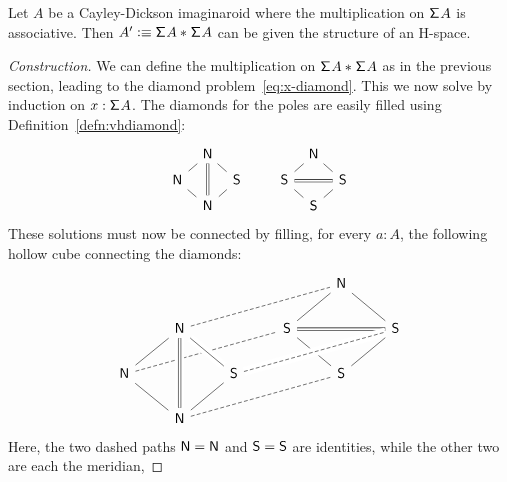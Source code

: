 \begin{defn}\label{def:imag-h-space}
Let $A$ be a Cayley-Dickson imaginaroid where the multiplication on
$\mathsf{\Sigma}^{} A$ is associative. Then $A' \vcentcolon\equiv {\mathsf{\Sigma}^{} A}\ast_{}{\mathsf{\Sigma}^{} A}$ can
be given the structure of an H-space.
\end{defn}
\begin{proof}[Construction]
We can define the multiplication on ${\mathsf{\Sigma}^{} A}\ast_{}{\mathsf{\Sigma}^{} A}$
as in the previous section, leading to the
diamond problem~\eqref{eq:x-diamond}. This we now solve by induction
on $x:\mathsf{\Sigma}^{} A$. The diamonds for the poles are easily filled using
Definition~\ref{defn:vhdiamond}:
\begin{equation*}
  \begin{tikzcd}[every arrow/.append style={-},row sep=tiny,column sep=tiny]
    & \north \arrow{dl}\arrow{dr}\arrow[-, double equal sign distance]{dd} & \\
    \north \arrow{dr} & & \south\arrow{dl} \\
    & \north &
  \end{tikzcd}\qquad
  \begin{tikzcd}[every arrow/.append style={-},row sep=tiny,column sep=tiny]
    & \north \arrow{dl}\arrow{dr} & \\
    \south \arrow{dr}\arrow[-, double equal sign distance]{rr} & & \south\arrow{dl} \\
    & \south &
  \end{tikzcd}
\end{equation*}
These solutions must now be connected by filling, for every $a : A$,
the following hollow cube connecting the diamonds:
\begin{equation*}
  \begin{tikzcd}[every arrow/.append style={-}]
    &   &   &   & \north\arrow{dl}\arrow{dr} & \\
    & \north\arrow{dl}\arrow{dr}\arrow[dashed]{urrr} &
    & \south\arrow{dr}\arrow[-, double equal sign distance]{rr} & & \south\arrow{dl} \\
    \north\arrow{dr}\arrow[dashed]{urrr} & &
    \south\arrow[crossing over]{ul}\arrow{dl}\arrow[dashed,crossing over]{urrr} &
    & \south & \\
    & \north\arrow[-, double equal sign distance,crossing over]{uu}\arrow[dashed]{urrr} & & & &
  \end{tikzcd}
\end{equation*}
Here, the two dashed paths $\mathsf{N}=\mathsf{N}$ and $\mathsf{S}=\mathsf{S}$ are
identities, while the other two are each the meridian,

\end{proof}
